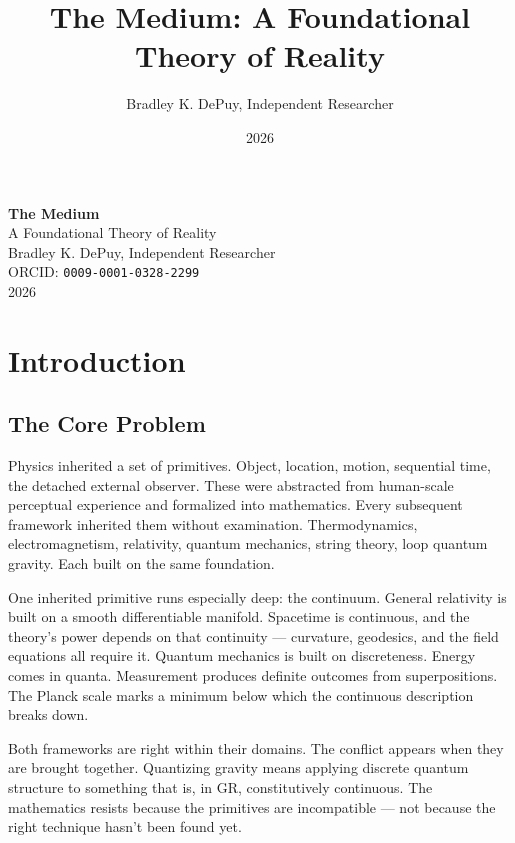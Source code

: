 \documentclass[11pt,letterpaper]{article}
\author{Bradley K. DePuy, Independent Researcher}
\date{2026}
\title{The Medium: A Foundational Theory of Reality}
\begin{document}
\pagestyle{plain}
\begin{titlepage}
\vspace*{4cm}
\begin{center}
  {\LARGE\bfseries The Medium}\\[0.6em]
  {\large A Foundational Theory of Reality}\\[2.5em]
  {\normalsize Bradley K. DePuy, Independent Researcher}\\[0.5em]
  {\normalsize ORCID: \mbox{\texttt{0009-0001-0328-2299}}}\\[0.5em]
  {\normalsize 2026}
\end{center}
\end{titlepage}

\pagestyle{body}

\section{Introduction}
\label{sec:org163c171}
\subsection{The Core Problem}
\label{sec:orgcd501c5}


Physics inherited a set of primitives. Object, location, motion, sequential time, the detached external observer. These were abstracted from human-scale perceptual experience and formalized into mathematics. Every subsequent framework inherited them without examination. Thermodynamics, electromagnetism, relativity, quantum mechanics, string theory, loop quantum gravity. Each built on the same foundation.

One inherited primitive runs especially deep: the continuum. General relativity is built on a smooth differentiable manifold. Spacetime is continuous, and the theory's power depends on that continuity — curvature, geodesics, and the field equations all require it. Quantum mechanics is built on discreteness. Energy comes in quanta. Measurement produces definite outcomes from superpositions. The Planck scale marks a minimum below which the continuous description breaks down.

Both frameworks are right within their domains. The conflict appears when they are brought together. Quantizing gravity means applying discrete quantum structure to something that is, in GR, constitutively continuous. The mathematics resists because the primitives are incompatible — not because the right technique hasn't been found yet.
\end{document}
